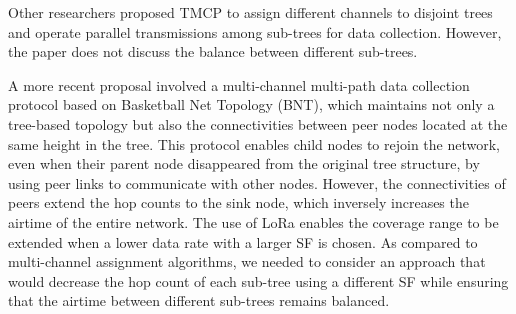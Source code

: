 Other researchers \cite{wu_realistic_2008} proposed TMCP to assign different channels to disjoint trees and operate parallel transmissions among sub-trees for data collection.
However,
	the paper does not discuss the balance between different sub-trees.

A more recent proposal \cite{liew_fast_2018} involved a multi-channel multi-path data collection protocol based on Basketball Net Topology (BNT),
	which maintains not only a tree-based topology but also the connectivities between peer nodes located at the same height in the tree.
This protocol enables child nodes to rejoin the network,
	even when their parent node disappeared from the original tree structure,
	by using peer links to communicate with other nodes.
However,
	the connectivities of peers extend the hop counts to the sink node,
	which inversely increases the airtime of the entire network.
The use of LoRa enables the coverage range to be extended when a lower data rate with a larger SF is chosen.
As compared to multi-channel assignment algorithms,
	we needed to consider an approach that would decrease the hop count of each sub-tree using a different SF while ensuring that the airtime between different sub-trees remains balanced.


